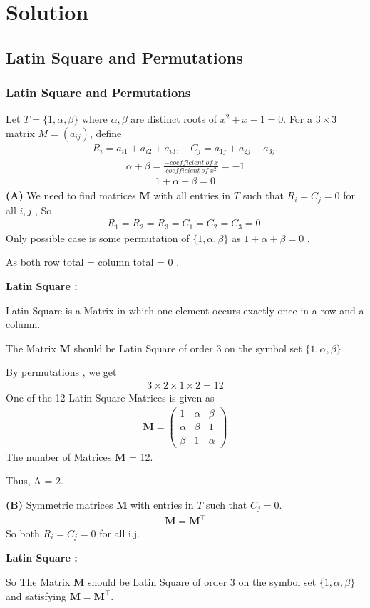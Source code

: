 \documentclass{beamer}
\theoremstyle{remark}
\newcommand{\myvec}[1]{\ensuremath{\begin{pmatrix}#1\end{pmatrix}}}
\let\vec\mathbf
\numberwithin{equation}{section}
\numberwithin{equation}{section}
\begin{document}
\section{Solution}
\subsection{Latin Square and Permutations}
\begin{frame}
\frametitle{Latin Square and Permutations}

Let $T = \{1,\alpha,\beta\}$ where $\alpha,\beta$ are distinct roots of $x^2+x-1=0$.  
For a $3 \times 3$ matrix $M = (a_{ij})$, define
\begin{align}
R_i = a_{i1} + a_{i2} + a_{i3}, 
\quad 
C_j = a_{1j} + a_{2j} + a_{3j}.
\end{align}
\begin{align}
\alpha+\beta = \frac{-coefficient \ of \ x}{coefficient \ of \ x^2} = -1
\end{align}
\begin{align}
1+\alpha+\beta = 0
\end{align}
\textbf{(A)} We need to find matrices $\vec{M}$ with all entries in $T$ such that $R_i=C_j=0$ for all $i,j$ ,
So
\begin{align}
R_1 = R_2 = R_3 = C_1 = C_2 = C_3 = 0.
\end{align}
Only possible case is some permutation of $\{1,\alpha,\beta\}$ as $1 + \alpha + \beta = 0$ .

As both row total = column total = 0 .

\textbf{Latin Square :}

Latin Square is a Matrix in which one element occurs exactly once in a row and a column.
\end{frame}
\begin{frame}
The Matrix $\vec{M}$ should be Latin Square of order 3 on the symbol set $\{1,\alpha,\beta\}$ 

By permutations , we get
\begin{align}
3\times2\times1\times2 = 12
\end{align}
One of the 12 Latin Square Matrices is given as 
\begin{align}
\vec{M} = \myvec{1 & \alpha & \beta \\
       \alpha & \beta & 1 \\
       \beta & 1 & \alpha}
\end{align}
The number of Matrices $\vec{M}$ = 12.

Thus, A = 2.

\textbf{(B)} Symmetric matrices $\vec{M}$ with entries in $T$ such that $C_j=0$.  
\begin{align}
\vec{M} = \vec{M^\top}
\end{align}
So both $R_i = C_j = 0$ for all i,j. 

\textbf{Latin Square :}

So The Matrix $\vec{M}$ should be Latin Square of order 3 on the symbol set $\{1,\alpha,\beta\}$ and satisfying $\vec{M}=\vec{M}^\top$.
\end{frame}
\end{document}
